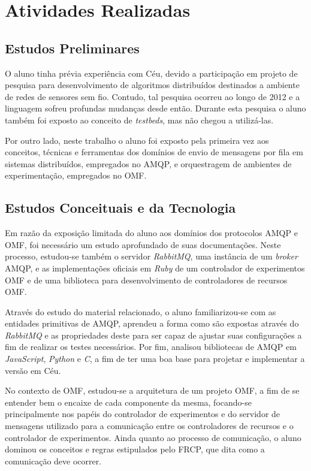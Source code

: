 \chapter{Atividades Realizadas}

\section{Estudos Preliminares}

O aluno tinha prévia experiência com Céu, devido a participação em projeto de pesquisa para desenvolvimento de algoritmos distribuídos destinados a ambiente de redes de sensores sem fio. Contudo, tal pesquisa ocorreu ao longo de 2012 e a linguagem sofreu profundas mudanças desde então. Durante esta pesquisa o aluno também foi exposto ao conceito de \textit{testbeds}, mas não chegou a utilizá-las.

Por outro lado, neste trabalho o aluno foi exposto pela primeira vez aos conceitos, técnicas e ferramentas dos domínios de envio de mensagens por fila em sistemas distribuídos, empregados no AMQP, e orquestragem de ambientes de experimentação, empregados no OMF. 

\section{Estudos Conceituais e da Tecnologia}

Em razão da exposição limitada do aluno aos domínios dos protocolos AMQP e OMF, foi necessário um estudo aprofundado de suas documentações. Neste processo, estudou-se também o servidor \textit{RabbitMQ}, uma instância de um \textit{broker} AMQP, e as implementações oficiais em \textit{Ruby} de um controlador de experimentos OMF e de uma biblioteca para desenvolvimento de controladores de recursos OMF.

Através do estudo do material relacionado, o aluno familiarizou-se com as entidades primitivas de AMQP, aprendeu a forma como são expostas através do \textit{RabbitMQ} e as propriedades deste para ser capaz de ajustar suas configurações a fim de realizar os testes necessários. Por fim, analisou bibliotecas de AMQP em \textit{JavaScript}, \textit{Python} e \textit{C}, a fim de ter uma boa base para projetar e implementar a versão em Céu.

No contexto de OMF, estudou-se a arquitetura de um projeto OMF, a fim de se entender bem o encaixe de cada componente da mesma, focando-se principalmente nos papéis do controlador de experimentos e do servidor de mensagens utilizado para a comunicação entre os controladores de recursos e o controlador de experimentos. Ainda quanto ao processo de comunicação, o aluno dominou os conceitos e regras estipulados pelo FRCP, que dita como a comunicação deve ocorrer.

